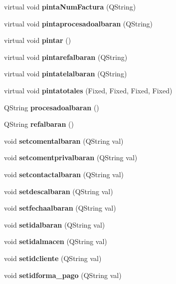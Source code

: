 \begin{CompactItemize}
\item 
virtual void {\bf pinta\-Num\-Factura} (QString)\label{classAlbaranCliente_a32}

\item 
virtual void {\bf pintaprocesadoalbaran} (QString)\label{classAlbaranCliente_a33}

\item 
virtual void {\bf pintar} ()
\item 
virtual void {\bf pintarefalbaran} (QString)\label{classAlbaranCliente_a35}

\item 
virtual void {\bf pintatelalbaran} (QString)\label{classAlbaranCliente_a36}

\item 
virtual void {\bf pintatotales} (Fixed, Fixed, Fixed, Fixed)\label{classAlbaranCliente_a37}

\item 
QString {\bf procesadoalbaran} ()\label{classAlbaranCliente_a38}

\item 
QString {\bf refalbaran} ()\label{classAlbaranCliente_a39}

\item 
void {\bf setcomentalbaran} (QString val)\label{classAlbaranCliente_a40}

\item 
void {\bf setcomentprivalbaran} (QString val)\label{classAlbaranCliente_a41}

\item 
void {\bf setcontactalbaran} (QString val)\label{classAlbaranCliente_a42}

\item 
void {\bf setdescalbaran} (QString val)\label{classAlbaranCliente_a43}

\item 
void {\bf setfechaalbaran} (QString val)\label{classAlbaranCliente_a44}

\item 
void {\bf setidalbaran} (QString val)\label{classAlbaranCliente_a45}

\item 
void {\bf setidalmacen} (QString val)\label{classAlbaranCliente_a46}

\item 
void {\bf setidcliente} (QString val)\label{classAlbaranCliente_a47}

\item 
void {\bf setidforma\_\-pago} (QString val)\label{classAlbaranCliente_a48}


\end{CompactItemize}
